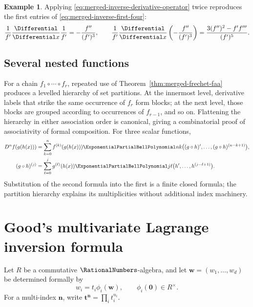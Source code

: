 \documentclass[11pt,a4paper,oneside,openany]{book}
\theoremstyle{definition}
\newtheorem{example}[theorem]{Example}
\theoremstyle{remark}
\begin{document}
\begin{example}
Applying \eqref{eq:merged-inverse-derivative-operator} twice reproduces the
first entries of \eqref{eq:merged-inverse-first-four}:
\[
 \frac1{f'}\frac{\Differential}{\Differential x}\frac1{f'}
 =-\frac{f''}{(f')^3},
 \qquad
 \frac1{f'}\frac{\Differential}{\Differential x}
 \left(-\frac{f''}{(f')^3}\right)
 =\frac{3(f'')^2-f'f'''}{(f')^5}.
\]
\end{example}

\section{Several nested functions}

For a chain $f_1\circ\cdots\circ f_r$, repeated use of
Theorem~\ref{thm:merged-frechet-faa} produces a levelled hierarchy of set
partitions.  At the innermost level, derivative labels that strike the same
occurrence of $f_r$ form blocks; at the next level, those blocks are grouped
according to occurrences of $f_{r-1}$, and so on.  Flattening the hierarchy in
either association order is canonical, giving a combinatorial proof of
associativity of formal composition.  For three scalar functions,
\begin{align}
 D^n f(g(h(x)))
 &=\sum_{k=0}^{n}f^{(k)}(g(h(x)))
   \ExponentialPartialBellPolynomial nk\bigl((g\circ h)',\ldots,(g\circ h)^{(n-k+1)}\bigr),    \label{eq:merged-three-composition}\\
 (g\circ h)^{(j)}
 &=\sum_{\ell=0}^{j}g^{(\ell)}(h(x))
   \ExponentialPartialBellPolynomial j\ell\bigl(h',\ldots,h^{(j-\ell+1)}\bigr).              \label{eq:merged-three-composition-inner}
\end{align}
Substitution of the second formula into the first is a finite closed formula;
the partition hierarchy explains its multiplicities without additional index
machinery.

\chapter{Good's multivariate Lagrange inversion formula}
\label{ch:merged-good}

Let $R$ be a commutative $\RationalNumbers$-algebra, and let
$\bm w=(w_1,\ldots,w_d)$ be determined formally by
\begin{equation}
 w_i=t_i\phi_i(\bm w),\qquad \phi_i(\bm0)\in R^\times.            \label{eq:merged-good-system}
\end{equation}
For a multi-index $\bm n$, write
$\bm t^{\bm n}=\prod_it_i^{n_i}$.
\end{document}

